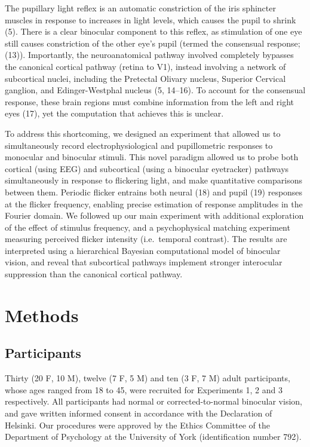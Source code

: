 \documentclass[
]{article}
\begin{document}
The pupillary light reflex is an automatic constriction of the iris sphincter muscles in response to increases in light levels, which causes the pupil to shrink (5). There is a clear binocular component to this reflex, as stimulation of one eye still causes constriction of the other eye's pupil (termed the consensual response; (13)). Importantly, the neuroanatomical pathway involved completely bypasses the canonical cortical pathway (retina to V1), instead involving a network of subcortical nuclei, including the Pretectal Olivary nucleus, Superior Cervical ganglion, and Edinger-Westphal nucleus (5, 14--16). To account for the consensual response, these brain regions must combine information from the left and right eyes (17), yet the computation that achieves this is unclear.

To address this shortcoming, we designed an experiment that allowed us to simultaneously record electrophysiological and pupillometric responses to monocular and binocular stimuli. This novel paradigm allowed us to probe both cortical (using EEG) and subcortical (using a binocular eyetracker) pathways simultaneously in response to flickering light, and make quantitative comparisons between them. Periodic flicker entrains both neural (18) and pupil (19) responses at the flicker frequency, enabling precise estimation of response amplitudes in the Fourier domain. We followed up our main experiment with additional exploration of the effect of stimulus frequency, and a psychophysical matching experiment measuring perceived flicker intensity (i.e.~temporal contrast). The results are interpreted using a hierarchical Bayesian computational model of binocular vision, and reveal that subcortical pathways implement stronger interocular suppression than the canonical cortical pathway.

\hypertarget{methods}{%
\section{Methods}\label{methods}}

\hypertarget{participants}{%
\subsection{Participants}\label{participants}}

Thirty (20 F, 10 M), twelve (7 F, 5 M) and ten (3 F, 7 M) adult participants, whose ages ranged from 18 to 45, were recruited for Experiments 1, 2 and 3 respectively. All participants had normal or corrected-to-normal binocular vision, and gave written informed consent in accordance with the Declaration of Helsinki. Our procedures were approved by the Ethics Committee of the Department of Psychology at the University of York (identification number 792).
\end{document}
